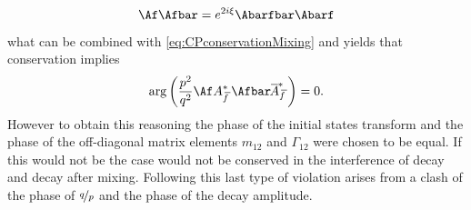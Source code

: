 \begin{equation}
\Af\Afbar=e^{2i\xi}\Abarfbar\Abarf
\end{equation}
what can be combined with \cref{eq:CPconservationMixing} and yields that \CP conservation implies
\begin{equation}
\arg\left(\frac{p^2}{q^2}\Af A_{\kern 1.5pt\overline{\kern -1.5pt f\kern 1.5pt}}^\ast\Afbar\overline{\kern -1.0pt A\kern -1.0pt}_{\kern 2.5pt\overline{\kern -1.5pt f\kern 1.5pt}}^\ast\right)=0.
\end{equation}
However to obtain this reasoning the \CP phase of the initial states transform and the phase of the off-diagonal matrix elements $m_{12}$ and $\Gamma_{12}$ were chosen to be equal.
If this would not be the case \CP would not be conserved in the interference of decay and decay after mixing.
Following this last type of \CP violation arises from a clash of the phase of $\nicefrac{q}{p}$ and the phase of the decay amplitude.

